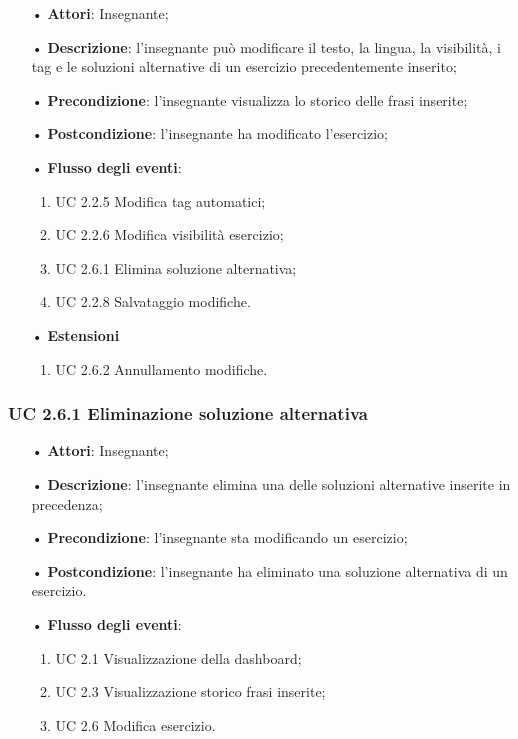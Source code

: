 \begin{itemize}
	\item[•] \textbf{Attori}: Insegnante;
	\item[•] \textbf{Descrizione}: l’insegnante può modificare il testo, la lingua, la visibilità, i tag e le soluzioni alternative di un esercizio precedentemente inserito;
	\item[•] \textbf{Precondizione}: l'insegnante visualizza lo storico delle frasi inserite;
	\item[•] \textbf{Postcondizione}: l’insegnante ha modificato l'esercizio;
	\item[•] \textbf{Flusso degli eventi}:
		\begin{enumerate}
			\item UC 2.2.5 Modifica tag automatici;
			\item UC 2.2.6 Modifica visibilità esercizio;
			\item UC 2.6.1 Elimina soluzione alternativa;
			\item UC 2.2.8 Salvataggio modifiche.
		\end{enumerate}
	\item[•] \textbf{Estensioni}
	\begin{enumerate}
		\item UC 2.6.2 Annullamento modifiche.
	\end{enumerate}
\end{itemize}   

\subsubsection{UC 2.6.1 Eliminazione soluzione alternativa}
\begin{itemize}
	\item[•] \textbf{Attori}: Insegnante;
	\item[•] \textbf{Descrizione}: l'insegnante elimina una delle soluzioni alternative inserite in precedenza;
	\item[•] \textbf{Precondizione}: l'insegnante sta modificando un esercizio;
	\item[•] \textbf{Postcondizione}: l'insegnante ha eliminato una soluzione alternativa di un esercizio.
	\item[•] \textbf{Flusso degli eventi}: 
	\begin{enumerate}
		\item UC 2.1 Visualizzazione della dashboard;
		\item UC 2.3 Visualizzazione storico frasi inserite;
		\item UC 2.6 Modifica esercizio.
	\end{enumerate}
\end{itemize}

